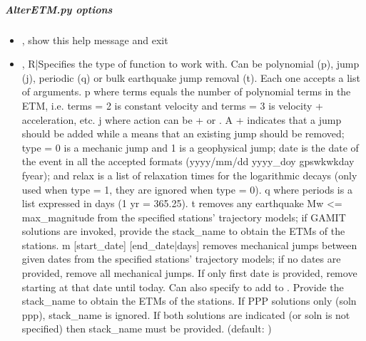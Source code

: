 \documentclass[letterpaper,10pt,english]{sphinxmanual}
\begin{document}
\subparagraph{AlterETM.py options}
\label{\detokenize{pgamit.com:AlterETM.py-options}}\begin{itemize}
\item {} 
\sphinxAtStartPar
{\hyperref[\detokenize{pgamit.com:AlterETM.py--h}]{}}, {\hyperref[\detokenize{pgamit.com:AlterETM.py---help}]{}} \sphinxhyphen{} show this help message and exit

\item {} 
\sphinxAtStartPar
{\hyperref[\detokenize{pgamit.com:AlterETM.py--fun}]{}} , {\hyperref[\detokenize{pgamit.com:AlterETM.py---function_type}]{}}  \sphinxhyphen{} R|Specifies the type of function to work with. Can be polynomial (p), jump (j), periodic (q) or bulk earthquake jump removal (t). Each one accepts a list of arguments.
p  where terms equals the number of polynomial terms in the ETM, i.e. terms = 2 is constant velocity and terms = 3 is velocity + acceleration, etc.
j     where action can be + or \sphinxhyphen{}. A + indicates that a jump should be added while a \sphinxhyphen{} means that an existing jump should be removed; type = 0 is a mechanic jump and 1 is a geophysical jump; date is the date of the event in all the accepted formats (yyyy/mm/dd yyyy\_doy gpswk\sphinxhyphen{}wkday fyear); and relax is a list of relaxation times for the logarithmic decays (only used when type = 1, they are ignored when type = 0).
q  where periods is a list expressed in days (1 yr = 365.25).
t   removes any earthquake Mw \textless{}= max\_magnitude from the specified stations’ trajectory models; if GAMIT solutions are invoked, provide the stack\_name to obtain the ETMs of the stations.
m  {[}start\_date{]} {[}end\_date|days{]} removes mechanical jumps between given dates from the specified stations’ trajectory models; if no dates are provided, remove all mechanical jumps. If only first date is provided, remove starting at that date until today. Can also specify   to add to . Provide the stack\_name to obtain the ETMs of the stations. If PPP solutions only (\sphinxhyphen{}soln ppp), stack\_name is ignored. If both solutions are indicated (or \sphinxhyphen{}soln is not specified) then stack\_name must be provided. (default: \sphinxcode{\sphinxupquote{{[}{]}}})


\end{itemize}
\end{document}
